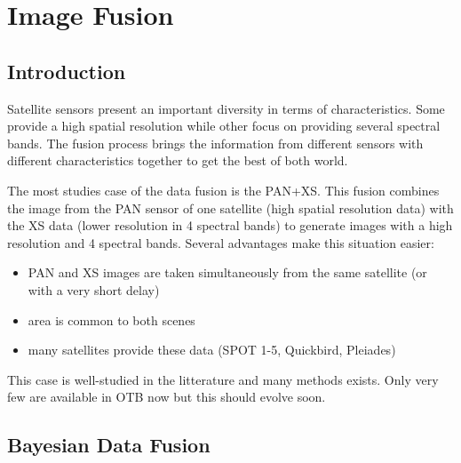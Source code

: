 
\chapter{Image Fusion }
\section{Introduction}

Satellite sensors present an important diversity in terms of characteristics.
Some provide a high spatial resolution while other focus on providing several
spectral bands. The fusion process brings the information from different
sensors with different characteristics together to get the best of both
world.

The most studies case of the data fusion is the PAN+XS. This fusion combines
the image from the PAN sensor of one satellite (high spatial resolution data)
with the XS data (lower resolution in 4 spectral bands) to generate images with
a high resolution and 4 spectral bands. Several advantages make this situation
easier:

\begin{itemize}
\item PAN and XS images are taken simultaneously from the same satellite (or
with a very short delay)
\item area is common to both scenes
\item many satellites provide these data (SPOT 1-5, Quickbird, Pleiades)
\end{itemize}

This case is well-studied in the litterature and many methods exists. Only very
few are available in OTB now but this should evolve soon.



\section{Bayesian Data Fusion}\label{secBayesian}



